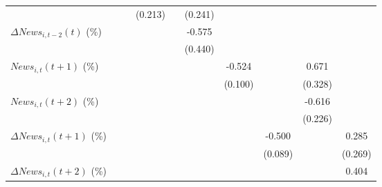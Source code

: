 {\begin{tabular}{l*{9}{c}}
                    &                     &                     &     (0.213)         &                     &     (0.241)         &                     &                     &                     &                     \\
\addlinespace
$ \Delta News_{i,t-2}(t)$ (\%)&                     &                     &                     &                     &      -0.575         &                     &                     &                     &                     \\
                    &                     &                     &                     &                     &     (0.440)         &                     &                     &                     &                     \\
\addlinespace
$ News_{i,t}(t+1)$ (\%)&                     &                     &                     &                     &                     &      -0.524\sym{***}&                     &       0.671\sym{*}  &                     \\
                    &                     &                     &                     &                     &                     &     (0.100)         &                     &     (0.328)         &                     \\
\addlinespace
$ News_{i,t}(t+2)$ (\%)&                     &                     &                     &                     &                     &                     &                     &      -0.616\sym{**} &                     \\
                    &                     &                     &                     &                     &                     &                     &                     &     (0.226)         &                     \\
\addlinespace
$ \Delta News_{i,t}(t+1)$ (\%)&                     &                     &                     &                     &                     &                     &      -0.500\sym{***}&                     &       0.285         \\
                    &                     &                     &                     &                     &                     &                     &     (0.089)         &                     &     (0.269)         \\
\addlinespace
$ \Delta News_{i,t}(t+2)$ (\%)&                     &                     &                     &                     &                     &                     &                     &                     &       0.404         \\

\end{tabular}}
